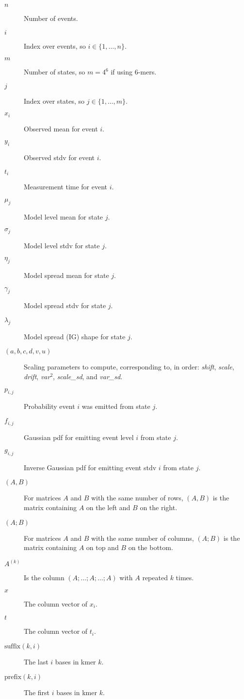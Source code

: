 \documentclass{article}
\newcommand{\suffix}{\ensuremath{\mathrm{suffix}}}
\newcommand{\prefix}{\ensuremath{\mathrm{prefix}}}
\begin{document}
\begin{description}
\item[$n$] Number of events.
\item[$i$] Index over events, so $i \in \{1, \dots, n\}$.
\item[$m$] Number of states, so $m = 4^6$ if using 6-mers.
\item[$j$] Index over states, so $j \in \{1, \dots, m\}$.
\item[$x_i$] Observed mean for event $i$.
\item[$y_i$] Observed stdv for event $i$.
\item[$t_i$] Measurement time for event $i$.
\item[$\mu_j$] Model level mean for state $j$.
\item[$\sigma_j$] Model level stdv for state $j$.
\item[$\eta_j$] Model spread mean for state $j$.
\item[$\gamma_j$] Model spread stdv for state $j$.
\item[$\lambda_j$] Model spread (IG) shape for state $j$.
\item[$(a,b,c,d,v,u)$] Scaling parameters to compute, corresponding to, in order: \emph{shift}, \emph{scale}, \emph{drift}, \emph{var}$^2$, \emph{scale\_sd}, and \emph{var\_sd}.
\item[$p_{i,j}$] Probability event $i$ was emitted from state $j$.
\item[$f_{i,j}$] Gaussian pdf for emitting event level $i$ from state $j$.
\item[$g_{i,j}$] Inverse Gaussian pdf for emitting event stdv $i$ from state $j$.
\item[$(A,B)$] For matrices $A$ and $B$ with the same number of rows, $(A,B)$ is the matrix containing $A$ on the left and $B$ on the right.
\item[$(A;B)$] For matrices $A$ and $B$ with the same number of columns, $(A;B)$ is the matrix containing $A$ on top and $B$ on the bottom.
\item[$A^{(k)}$] Is the column $(A;\dots;A;\dots;A)$ with $A$ repeated $k$ times.
\item[$x$] The column vector of $x_i$.
\item[$t$] The column vector of $t_i$.
\item[$\suffix(k,i)$] The last $i$ bases in kmer $k$.
\item[$\prefix(k,i)$] The first $i$ bases in kmer $k$.
\end{description}
\end{document}
